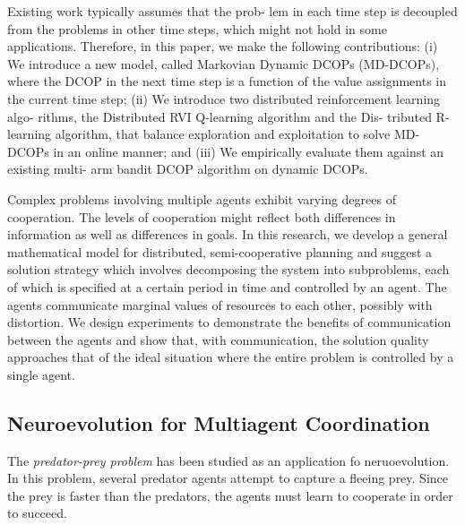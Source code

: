\documentclass[conference]{IEEEtran}
\begin{document}
\cite{nguyen2014decentralized} Existing work typically assumes that the prob-
lem in each time step is decoupled from the problems in other time steps,
which might not hold in some applications. Therefore, in this paper, we make
the following contributions: (i) We introduce a new model, called Markovian
Dynamic DCOPs (MD-DCOPs), where the DCOP in the next time step is a function
of the value assignments in the current time step; (ii) We introduce two
distributed reinforcement learning algo- rithms, the Distributed RVI
Q-learning algorithm and the Dis- tributed R-learning algorithm, that balance
exploration and exploitation to solve MD-DCOPs in an online manner; and (iii)
We empirically evaluate them against an existing multi- arm bandit DCOP
algorithm on dynamic DCOPs.


\cite{zhang2013coordinating}

\cite{banerjee2012sample}

\cite{kraemer2012informed}

\cite{boukhtouta2011adaptive}
Complex problems involving multiple agents exhibit varying degrees of
cooperation. The levels of cooperation might reflect both differences in
information as well as differences in goals. In this research, we develop a
general mathematical model for distributed, semi-cooperative planning and
suggest a solution strategy which involves decomposing the system into
subproblems, each of which is specified at a certain period in time and
controlled by an agent. The agents communicate marginal values of resources to
each other, possibly with distortion. We design experiments to demonstrate the
benefits of communication between the agents and show that, with
communication, the solution quality approaches that of the ideal situation
where the entire problem is controlled by a single agent.

\cite{sen1994learning}

\subsection{Neuroevolution for Multiagent Coordination}

The \textit{predator-prey problem} has been studied as an application fo neruoevolution. In this problem, several predator agents attempt to capture a fleeing prey. Since the prey is faster than the predators, the agents must learn to cooperate in order to succeed.
\end{document}
